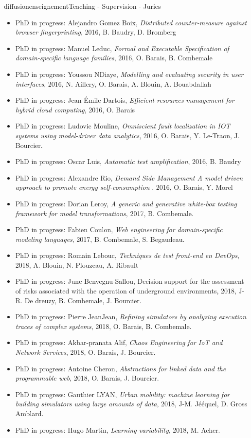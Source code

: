 \documentclass{ra2018}
\begin{document}
\begin{module}{diffusion}{enseignement}{Teaching - Supervision - Juries}
\begin{itemize}
\item PhD in progress: Alejandro Gomez Boix, \emph{Distributed counter-measure against browser fingerprinting}, 2016, B. Baudry, D. Bromberg
\item PhD in progress: Manuel Leduc, \emph{Formal and Executable Specification of domain-specific language families}, 2016, O. Barais, B. Combemale
\item PhD in progress: Youssou NDiaye, \emph{Modelling and evaluating security in user interfaces}, 2016, N. Aillery, O. Barais, A. Blouin, A. Bouabdallah
\item PhD in progress: Jean-Émile Dartois, \emph{Efficient resources management for hybrid cloud computing}, 2016, O. Barais
\item PhD in progress: Ludovic Mouline, \emph{Omniscient fault localization in IOT systems using model-driver data analytics}, 2016, O. Barais, Y. Le-Traon, J. Bourcier.
\item PhD in progress: Oscar Luis, \emph{Automatic test amplification}, 2016, B. Baudry
\item PhD in progress: Alexandre Rio, \emph{Demand Side Management A model driven approach to promote energy self-consumption }, 2016, O. Barais, Y. Morel
\item PhD in progress: Dorian Leroy, \emph{A generic and generative white-box testing framework for model transformations}, 2017, B. Combemale.
\item PhD in progress: Fabien Coulon, \emph{Web engineering for domain-specific modeling languages}, 2017, B. Combemale, S. Begaudeau.
\item PhD in progress: Romain Lebouc, \emph{Techniques de test front-end en DevOps}, 2018, A. Blouin, N. Plouzeau, A. Ribault
\item PhD in progress: June Benvegnu-Sallou, Decision support for the assessment of risks associated with the operation of underground environments, 2018, J-R. De dreuzy, B. Combemale, J. Bourcier.
\item PhD in progress: Pierre JeanJean, \emph{Refining simulators by analyzing execution traces of complex systems}, 2018,  O. Barais, B. Combemale.
\item PhD in progress: Akbar-pranata Alif, \emph{Chaos Engineering for IoT and Network Services}, 2018,  O. Barais, J. Bourcier.
\item PhD in progress: Antoine Cheron, \emph{Abstractions for linked data and the programmable web}, 2018,  O. Barais, J. Bourcier.
\item PhD in progress: Gauthier LYAN, \emph{Urban mobility: machine learning for building simulators using large amounts of data}, 2018,  J-M. J\'e\'equel, D. Gross Amblard.
\item PhD in progress: Hugo Martin, \emph{Learning variability}, 2018,  M. Acher.


\end{itemize}
\end{module}
\end{document}
